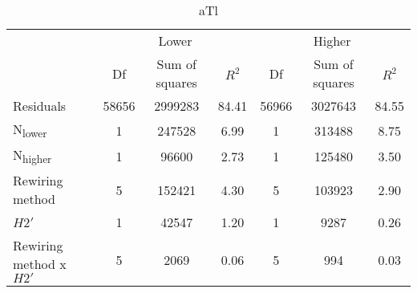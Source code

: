 \documentclass[12pt,a4paper]{article}
\begin{document}
\begin{table}[H]
\medskip
\begin{subtable}{\linewidth}
\caption{aTl}
\centering
\begin{tabularx}{\linewidth}{@{} X *6{c} @{}}
\toprule
  & \multicolumn{3}{c}{Lower} & \multicolumn{3}{c}{Higher} \\ \cmidrule(l){2-4} \cmidrule(l){5-7}
  						& Df		& Sum of squares	& $R^2$	& Df 	& Sum of squares	& $R^2$ \\ \midrule
Residuals 				& 58656 & 2999283			& 84.41	& 56966 & 3027643		& 84.55   \\
N\textsubscript{lower} 	& 1 		& 247528 		& 6.99 	& 1		& 313488			& 8.75  \\
N\textsubscript{higher} 	& 1 		& 96600 			& 2.73	& 1 		& 125480		& 3.50  \\
Rewiring method 			& 5 		& 152421 			& 4.30 	& 5 		& 103923		& 2.90  \\
$H2'$ 					& 1 		& 42547 			& 1.20 	& 1 		& 9287			& 0.26 \\
Rewiring method x $H2'$ 	& 5 		& 2069 			& 0.06 	& 5 		& 994			& 0.03  \\ \bottomrule
\end{tabularx}

\end{subtable}
\end{table}

\end{document}
